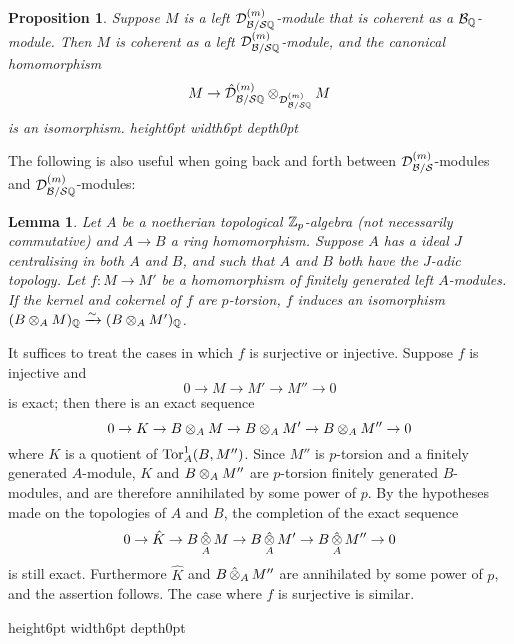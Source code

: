 \documentclass{article}
\theoremstyle{change}
\newtheorem{prop}[subsubsection]{Proposition}
\newtheorem{lemma}[subsubsection]{Lemma}
\numberwithin{equation}{subsubsection}
\newcommand{\demobox}{\vrule height6pt width6pt depth0pt}
\newcommand{\nodemo}{\unskip\nobreak\hfil\qquad
\demobox\parfillskip=0pt\par}
\newenvironment{demo}{\noindent{\it Proof.}}
{{\unskip\nobreak\hfil\qquad
\demobox\parfillskip=0pt\par}
\medskip}
\begin{document}
\begin{prop}\label{prop:Dm-and-Dmhat-coherent-Q}
  Suppose $M$ is a left ${{\cal D}}^{({m})}_{{\cal B}/{\cal S}{\mathbb Q}}$-module that is
  coherent as a ${\cal B}_{\mathbb Q}$-module. Then $M$ is coherent as a left
  ${{\cal D}}^{({m})}_{{\cal B}/{\cal S}{\mathbb Q}}$-module, and the canonical homomorphism
  \begin{displaymath}
    M\to{\hat{\cal D}}^{({m})}_{{\cal B}/{\cal S}{\mathbb Q}}\otimes_{{{\cal D}}^{({m})}_{{\cal B}/{\cal S}{\mathbb Q}}}M
  \end{displaymath}
  is an isomorphism. \nodemo
\end{prop}

The following is also useful when going back and forth between
${{\cal D}}^{({m})}_{{\cal B}/{\cal S}}$-modules and
${{\cal D}}^{({m})}_{{\cal B}/{\cal S}{\mathbb Q}}$-modules:

\begin{lemma}\label{lemma:choice-of-integral-model}
  Let $A$ be a noetherian topological ${\mathbb Z}_p$-algebra (not necessarily
  commutative) and $A\to B$ a ring homomorphism. Suppose $A$ has a
  ideal $J$ centralising in both $A$ and $B$, and such that $A$ and
  $B$ both have the $J$-adic topology. Let $f:M\to M'$ be a
  homomorphism of finitely generated left $A$-modules. If the kernel
  and cokernel of $f$ are $p$-torsion, $f$ induces an isomorphism
  $(B\otimes_AM)_{\mathbb Q}\xrightarrow{\sim}(B\otimes_AM')_{\mathbb Q}$.
\end{lemma}
\begin{demo}
  It suffices to treat the cases in which $f$ is surjective or
  injective. Suppose $f$ is injective and
  \begin{displaymath}
    0\to M\to M'\to M''\to 0
  \end{displaymath}
  is exact; then there is an exact sequence
  \begin{displaymath}
    0\to K\to B\otimes_AM\to B\otimes_AM'\to B\otimes_AM''\to 0
  \end{displaymath}
  where $K$ is a quotient of ${\operatorname{Tor}}^1_A(B,M'')$. Since $M''$ is
  $p$-torsion and a finitely generated $A$-module, $K$ and
  $B\otimes_AM''$ are $p$-torsion finitely generated $B$-modules, and
  are therefore annihilated by some power of $p$. By the hypotheses
  made on the topologies of $A$ and $B$, the completion of the exact
  sequence
  \begin{displaymath}
    0\to\hat K\to B\mathop{\hat\otimes}_AM\to B\mathop{\hat\otimes}_AM'\to B\mathop{\hat\otimes}_AM''\to 0
  \end{displaymath}
  is still exact. Furthermore $\hat K$ and $B\mathop{\hat\otimes}_AM''$ are
  annihilated by some power of $p$, and the assertion follows. The
  case where $f$ is surjective is similar.
\end{demo}
\end{document}
